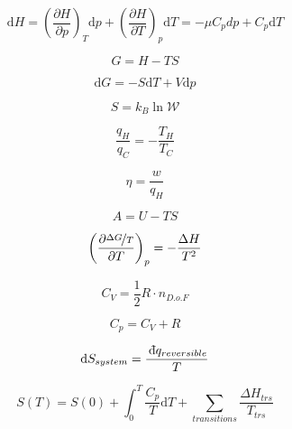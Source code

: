 \documentclass[12pt, letterpaper]{memoir}
\begin{document}
\begin{equation*}
\mathrm{d}H=\left(\dfrac{\partial H}{\partial p}\right)_{\!\!T}\mathrm{d}p + \left(\dfrac{\partial H}{\partial T}\right)_{\!\!p}\mathrm{d}T=-\mu C_p{d}p + C_p\mathrm{d}T
\end{equation*}

\noindent
\begin{minipage}{0.5\linewidth}
	\begin{equation*}
		G = H-TS
	\end{equation*}

	\begin{equation*}
		\mathrm{d}G=-S\mathrm{d}T+V\mathrm{d}p
	\end{equation*}

	\begin{equation*}
		S=k_B\ln \mathcal{W}
	\end{equation*}	

	\begin{equation*}
		\dfrac{q_H}{q_C}=-\dfrac{T_H}{T_C}
	\end{equation*}	

	\begin{equation*}
		\eta = \dfrac{w}{q_H}
	\end{equation*}	
\end{minipage}
\begin{minipage}{0.5\linewidth}
	\begin{equation*}
		A = U-TS
	\end{equation*}

	\begin{equation*}
		\left(\dfrac{\partial \nicefrac{\Delta G}{T}}{\partial T}\right)_p=-\dfrac{\Delta H}{T^2}
	\end{equation*}

	\begin{equation*}
		C_V = \dfrac{1}{2}R\cdot n_{D.o.F}
	\end{equation*}

	\begin{equation*}
		C_p = C_V+R
	\end{equation*}	

	\begin{equation*}
		\mathrm{d} S_{system} = \dfrac{~\dbar q_{reversible}}{T}
	\end{equation*}
\end{minipage}

\begin{equation*}
	S(T)=S(0)+\int_0^T\dfrac{C_p}{T}\mathrm{d}T+\sum\limits_{transitions}\dfrac{\Delta H_{trs}}{T_{trs}}
\end{equation*}	
\end{document}

